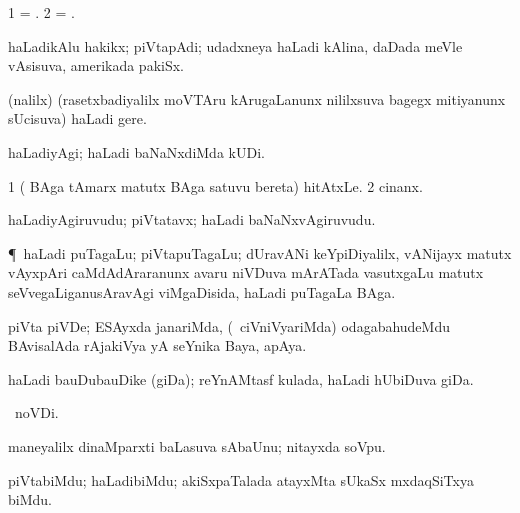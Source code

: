\bentry
{}
\gl{\nA} 
\bmng
\bnum
\num{1} = .  
\num{2} = . 
\enum
\emng
\eentry

\bentry
{} 
\gl{\nA} 
\bmng
haLadikAlu hakikx; piVtapAdi; udadxneya haLadi kAlina, daDada meVle vAsisuva, amerikada pakiSx.
\emng
\eentry

\bentry
{}
\gl{\nA} 
\bmng
(\UK nalilx) (rasetxbadiyalilx moVTAru kArugaLanunx nililxsuva bagegx mitiyanunx sUcisuva) haLadi gere.
\emng 
\eentry

\bentry
{} 
\gl{\kirxvi} 
\bmng
haLadiyAgi; haLadi baNaNxdiMda kUDi.
\emng
\eentry

\bentry
{}
\gl{\nA} 
\bmng
\bnum
\num{1} ( BAga tAmarx matutx  BAga satuvu bereta) hitAtxLe. 
\num{2} cinanx.
\enum
\emng
\eentry

\bentry
{} 
\gl{\nA}  
\bmng
haLadiyAgiruvudu;  piVtatavx; haLadi baNaNxvAgiruvudu.
\emng
\eentry

\bentry
{}
\gl{\nA} 
\bmng
\P\ haLadi puTagaLu; piVtapuTagaLu; dUravANi keYpiDiyalilx, vANijayx matutx vAyxpAri caMdAdAraranunx  avaru niVDuva mArATada vasutxgaLu matutx seVvegaLiganusAravAgi viMgaDisida, haLadi puTagaLa BAga.
\emng
\eentry

\bentry
{}
\gl{\nA} 
\bmng
piVta piVDe; ESAyxda janariMda, (\kanmu\ ciVniVyariMda) odagabahudeMdu BAvisalAda rAjakiVya yA seYnika Baya, apAya.
\emng
\eentry

\bentry
{} 
\gl{\nA} 
\bmng
haLadi bauDubauDike (giDa); reYnAMtasf kulada, haLadi hUbiDuva giDa.
\emng
\eentry

\bentry
{} 
\gl{\nA} 
\bmng
{} \pagu\ noVDi.
\emng
\eentry

\bentry
{}
\gl{\nA}  
\bmng
maneyalilx dinaMparxti baLasuva sAbaUnu; nitayxda soVpu.
\emng
\eentry

\bentry
{}
\gl{\nA}  
\bmng
piVtabiMdu; haLadibiMdu; akiSxpaTalada atayxMta sUkaSx mxdaqSiTxya biMdu. 
\emng
\eentry

